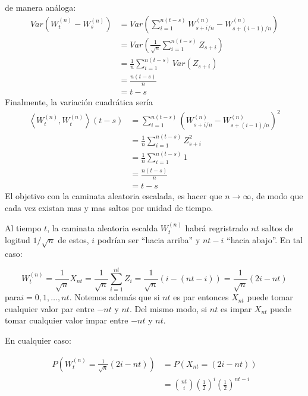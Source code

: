 \documentclass{extreport}
\theoremstyle{definicion}
\theoremstyle{propiedad}
\theoremstyle{teorema}
\begin{document}
de manera análoga:
\begin{equation*}
    \begin{split}
        Var\left(W^{(n)}_t-W^{(n)}_s\right) & = Var\left(\sum_{i= 1}^{n(t-s)}W_{s+i/n}^{(n)} - W_{s+(i-1)/n}^{(n)}\right)\\
                                     & = Var\left(\frac{1}{\sqrt{n}}\sum_{i= 1}^{n(t-s)}Z_{s+i}\right)\\
                                     & = \frac{1}{n}\sum_{i= 1}^{n(t-s)}Var\left(Z_{s+i}\right)\\
                                     & = \frac{n(t-s)}{n}\\
                                     &= t-s
    \end{split}
\end{equation*}
Finalmente, la variación cuadrática sería
\begin{equation*}
    \begin{split}
        \left\langle W^{(n)}_t, W^{(n)}_t\right\rangle(t-s) & = \sum_{i= 1}^{n(t-s)}\left(W_{s+i/n}^{(n)} - W_{s+(i-1)/n}^{(n)}\right)^2\\
                                     & = \frac{1}{n}\sum_{i= 1}^{n(t-s)}Z_{s+i}^2\\
                                     & = \frac{1}{n}\sum_{i= 1}^{n(t-s)}1\\
                                     & = \frac{n(t-s)}{n}\\
                                     &= t-s
    \end{split}
\end{equation*}
El objetivo con la caminata aleatoria escalada, es hacer que $n\rightarrow\infty$, de modo que cada vez existan mas y mas saltos por unidad de tiempo.

Al tiempo $t$, la caminata aleatoria escalda $W_{t}^{(n)}$ habrá regristrado $nt$ saltos de logitud $1/\sqrt{n}$ de estos, $i$ podrían ser  “hacia arriba” y $nt-i$  “hacia abajo”. En tal caso:

$$
W_{t}^{(n)} =\frac{1}{\sqrt{n}}X_{nt} =  \frac{1}{\sqrt{n}}\sum_{i=1}^{nt}Z_i = \frac{1}{\sqrt{n}}\left(i-(nt-i)\right)= \frac{1}{\sqrt{n}}\left(2i-nt\right)
$$
para$i=0,1,\ldots, nt$. Notemos además que si $nt$  es par entonces $X_{nt}$  puede tomar cualquier valor par entre $-nt$ y $nt$. Del mismo modo, si $nt$ es impar $X_{nt}$ puede tomar cualquier valor impar entre $-nt$ y $nt$.

En cualquier caso:

\begin{align*}
P\left(W_{t}^{(n)} = \frac{1}{\sqrt{n}} (2i-nt)\right) & = P\left(X_{nt} =(2i-nt) \right)\\
                                                       &= \binom{nt}{i}\left(\frac{1}{2}\right)^i\left(\frac{1}{2}\right)^{nt-i}
\end{align*}
\end{document}
